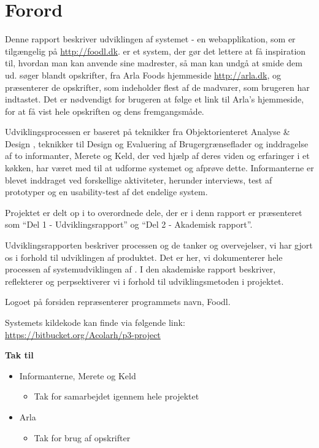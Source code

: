 \chapter*{Forord}
Denne rapport beskriver udviklingen af systemet \Foodl{} - en webapplikation, som er tilgængelig på \url{http://foodl.dk}. \Foodl{} er et system, der gør det lettere at få inspiration til, hvordan man kan anvende sine madrester, så man kan undgå at smide dem ud. \Foodl{} søger blandt opskrifter, fra Arla Foods hjemmeside \url{http://arla.dk}, og præsenterer de opskrifter, som indeholder flest af de madvarer, som brugeren har indtastet. Det er nødvendigt for brugeren at følge et link til Arla's hjemmeside, for at få vist hele opskriften og dens fremgangsmåde.

Udviklingsprocessen er baseret på teknikker fra Objektorienteret Analyse \& Design \cite{ooad}, teknikker til Design og Evaluering af Brugergrænseflader \cite{deb} og inddragelse af to informanter, Merete og Keld, der ved hjælp af deres viden og erfaringer i et køkken, har været med til at udforme systemet og afprøve dette. Informanterne er blevet inddraget ved forskellige aktiviteter, herunder interviews, test af prototyper og en usability-test af det endelige system.

Projektet er delt op i to overordnede dele, der er i denn rapport er præsenteret som ``Del 1 - Udviklingsrapport'' og ``Del 2 - Akademisk rapport''. 

Udviklingsrapporten beskriver processen og de tanker og overvejelser, vi har gjort os i forhold til udviklingen af produktet. Det er her, vi dokumenterer hele processen af systemudviklingen af \Foodl{}. I den akademiske rapport beskriver, reflekterer og perpsektiverer vi i forhold til udviklingsmetoden i projektet.

Logoet på forsiden repræsenterer programmets navn, Foodl.

Systemets kildekode kan finde via følgende link: \url{https://bitbucket.org/Acolarh/p3-project}

\textbf{Tak til}
\begin{itemize}[noitemsep]
\item Informanterne, Merete og Keld
\begin{itemize}[noitemsep]
\item Tak for samarbejdet igennem hele projektet
\end{itemize}
\item Arla
\begin{itemize}[noitemsep]
\item Tak for brug af opskrifter
\end{itemize}
\end{itemize}